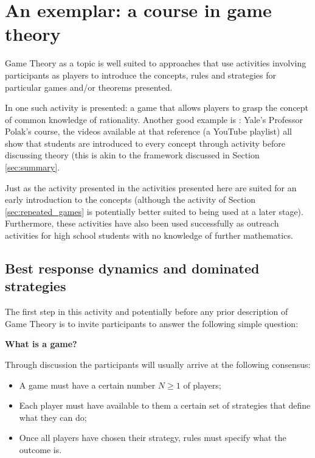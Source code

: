 \documentclass{article}
\begin{document}
\section{An exemplar: a course in game theory}\label{sec:game_theory}

Game Theory as a topic is well suited to approaches that use activities
involving participants as players to introduce the concepts, rules and strategies
for particular games and/or theorems presented.

In \cite{Brokaw2004} one such activity is presented: a game that allows players
to grasp the concept of common knowledge of rationality. Another good example is
\cite{Polak2008}: Yale's Professor Polak's course, the videos available at that
reference (a YouTube playlist) all show that students are introduced to every
concept through activity before discussing theory (this is akin to the framework
discussed in Section \ref{sec:summary}.

Just as the activity presented in \cite{Brokaw2004} the activities presented
here are suited for an early introduction to the concepts (although the activity
of Section \ref{sec:repeated_games} is potentially better suited to being used
at a later stage). Furthermore, these activities have also been used
successfully as outreach activities for high school students with no knowledge
of further mathematics.

\subsection{Best response dynamics and dominated strategies}\label{sec:best_responses}

The first step in this activity and potentially before any prior description of
Game Theory is to invite participants to answer the following simple question:

\begin{center}
    \textbf{What is a game?}
\end{center}

Through discussion the participants will usually arrive at the following consensus:

\begin{itemize}
    \item A game must have a certain number \(N\geq 1\) of players;
    \item Each player must have available to them a certain set of strategies
        that define what they can do;
    \item Once all players have chosen their strategy, rules must specify what
        the outcome is.
\end{itemize}
\end{document}
